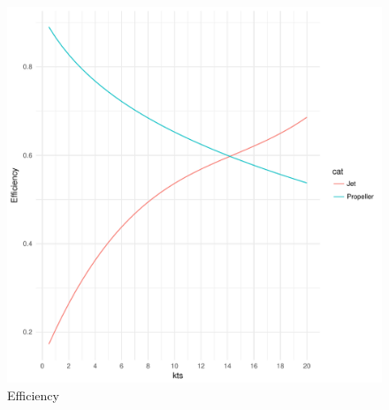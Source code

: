 \documentclass{article}\usepackage[]{graphicx}\usepackage[]{color}
\makeatletter
\def\maxwidth{ %
  \ifdim\Gin@nat@width>\linewidth
    \linewidth
  \else
    \Gin@nat@width
  \fi
}
\newenvironment{knitrout}{}{} %
\makeatother
\begin{document}
\begin{figure}
\begin{knitrout}
\color{fgcolor}

{\centering \includegraphics[width=\maxwidth]{figures/plots-plot_eff-1} 

}



\end{knitrout}
\caption{Efficiency}
\label{fig:Efficiency_plot}
\end{figure}
\end{document}
